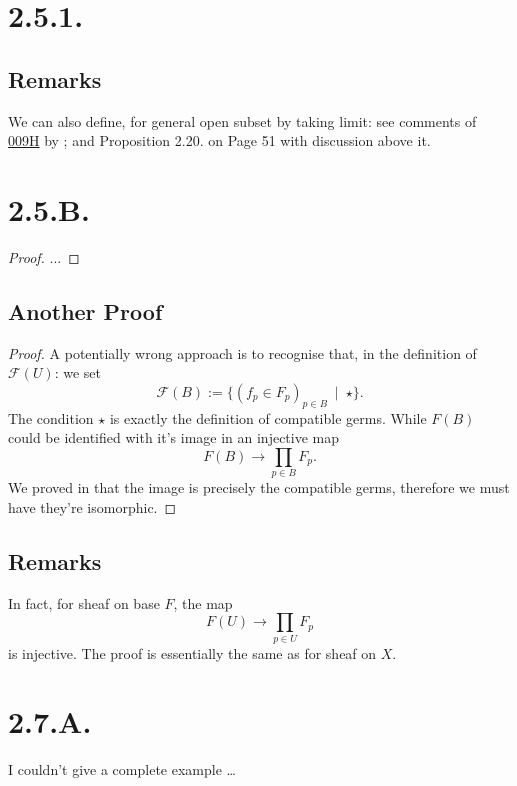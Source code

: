 \section{2.5.1.}

\subsection{Remarks}

We can also define, for general open subset by taking limit: see comments of \href{https://stacks.math.columbia.edu/tag/009H}{009H} by \cite{stacks-project}; and \cite{gortz2020algebraic} Proposition 2.20. on Page 51 with discussion above it.

\section{2.5.B.}

\begin{proof}
	...	
\end{proof}

\subsection{Another Proof}

\begin{proof}
A potentially wrong approach is to recognise that, in the definition of $\mathscr F(U)$: we set 
\[\mathscr F(B):=\{(f_p\in F_p)_{p\in B} ~\mid~ \star\}.\]
The condition $\star$ is exactly the definition of compatible germs. While $F(B)$ could be identified with it's image in an injective map
\[F(B)\to \prod_{p\in B}F_p.\]
We proved in  that the image is precisely the compatible germs, therefore we must have they're isomorphic.
\end{proof}

\subsection{Remarks}

In fact, for sheaf on base $F$, the map
\[F(U)\to\prod_{p\in U}F_p\] is injective. The proof is essentially the same as for sheaf on $X$.

\section{2.7.A.}

I couldn't give a complete example \dots


